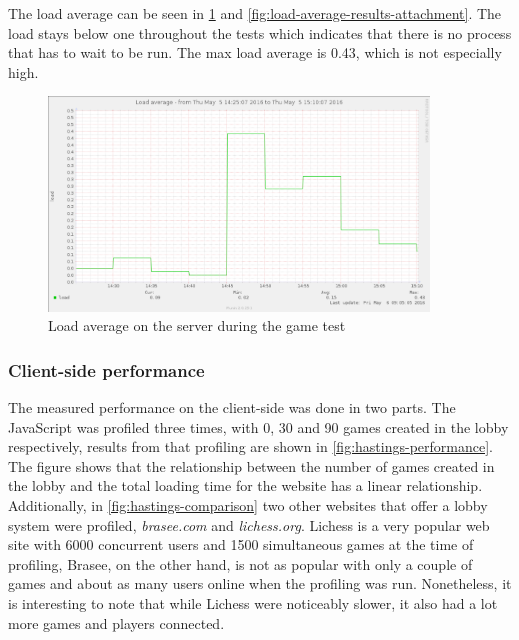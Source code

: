 \documentclass[a4paper]{article}
\begin{document}
The load average can be seen in \cref{fig:load-average-results} and \cref{fig:load-average-results-attachment}. The load stays below one throughout the tests which indicates that there is no process that has to wait to be run. The max load average is 0.43, which is not especially high.

\begin{figure}[H]
    \includegraphics[width=0.9\textwidth]{figure/serversidePerformance/2016-05-05-load-average-game-test.png}
    \caption{Load average on the server during the game test}
    \label{fig:load-average-results}
\end{figure}


\subsubsection{Client-side performance}
\label{subsub:client-performance-results}
The measured performance on the client-side was done in two parts. The JavaScript was profiled three times, with 0, 30 and 90 games created in the lobby respectively, results from that profiling are shown in \cref{fig:hastings-performance}. The figure shows that the relationship between the number of games created in the lobby and the total loading time for the website has a linear relationship. Additionally, in \cref{fig:hastings-comparison} two other websites that offer a lobby system were profiled, \textit{brasee.com} and \textit{lichess.org}. Lichess is a very popular web site with 6000 concurrent users and 1500 simultaneous games at the time of profiling, Brasee, on the other hand, is not as popular with only a couple of games and about as many users online when the profiling was run. Nonetheless, it is interesting to note that while Lichess were noticeably slower, it also had a lot more games and players connected.
\end{document}
